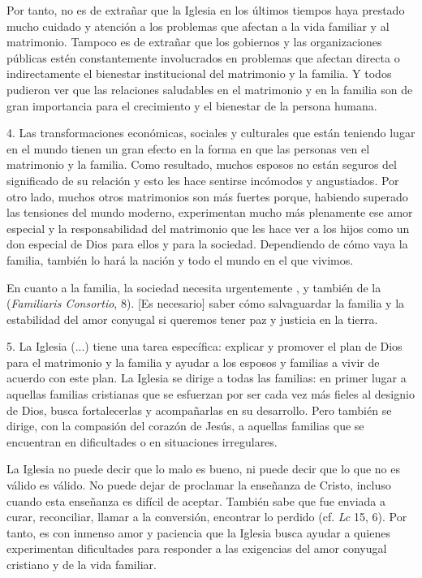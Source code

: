 \begin{body}
\begin{body}
		Por tanto, no es de extrañar que la Iglesia en los últimos tiempos haya prestado mucho cuidado y atención a los problemas que afectan a la vida familiar y al matrimonio. Tampoco es de extrañar que los gobiernos y las organizaciones públicas estén constantemente involucrados en problemas que afectan directa o indirectamente el bienestar institucional del matrimonio y la familia. Y todos pudieron ver que las relaciones saludables en el matrimonio y en la familia son de gran importancia para el crecimiento y el bienestar de la persona humana.
		
		4. Las transformaciones económicas, sociales y culturales que están teniendo lugar en el mundo tienen un gran efecto en la forma en que las personas ven el matrimonio y la familia. Como resultado, muchos esposos no están seguros del significado de su relación y esto les hace sentirse incómodos y angustiados. Por otro lado, muchos otros matrimonios son más fuertes porque, habiendo superado las tensiones del mundo moderno, experimentan mucho más plenamente ese amor especial y la responsabilidad del matrimonio que les hace ver a los hijos como un don especial de Dios para ellos y para la sociedad. Dependiendo de cómo vaya la familia, también lo hará la nación y todo el mundo en el que vivimos.
		
		En cuanto a la familia, la sociedad necesita urgentemente , y también de la  (\emph{Familiaris Consortio}, 8). {[}Es necesario{]} saber cómo salvaguardar la familia y la estabilidad del amor conyugal si queremos tener paz y justicia en la tierra.
		
		5. La Iglesia (...) tiene una tarea específica: explicar y promover el plan de Dios para el matrimonio y la familia y ayudar a los esposos y familias a vivir de acuerdo con este plan. La Iglesia se dirige a todas las familias: en primer lugar a aquellas familias cristianas que se esfuerzan por ser cada vez más fieles al designio de Dios, busca fortalecerlas y acompañarlas en su desarrollo. Pero también se dirige, con la compasión del corazón de Jesús, a aquellas familias que se encuentran en dificultades o en situaciones irregulares.
		
		La Iglesia no puede decir que lo malo es bueno, ni puede decir que lo que no es válido es válido. No puede dejar de proclamar la enseñanza de Cristo, incluso cuando esta enseñanza es difícil de aceptar. También sabe que fue enviada a curar, reconciliar, llamar a la conversión, encontrar lo perdido (cf. \emph{Lc} 15, 6). Por tanto, es con inmenso amor y paciencia que la Iglesia busca ayudar a quienes experimentan dificultades para responder a las exigencias del amor conyugal cristiano y de la vida familiar.
		

\end{body}
\end{body}
